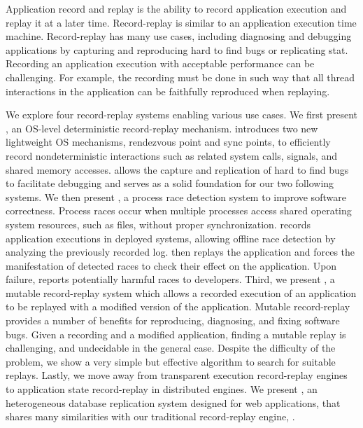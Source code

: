 Application record and replay is the ability to record application execution and
replay it at a later time.
Record-replay is similar to an application execution time machine.
Record-replay has many use cases, including diagnosing
and debugging applications by capturing and reproducing hard to find
bugs or replicating stat. Recording an application execution with acceptable performance can be
challenging. For example, the recording must be done in such way that all thread
interactions in the application can be faithfully reproduced when replaying.

We explore four record-replay systems enabling various use cases.
We first present \scribe, an OS-level deterministic record-replay mechanism.
\scribe introduces two new lightweight OS mechanisms, rendezvous point and sync
points, to efficiently record nondeterministic interactions such as related
system calls, signals, and shared memory accesses. \scribe allows the capture
and replication of hard to find bugs to facilitate debugging and serves as a
solid foundation for our two following systems.
We then present \racepro, a process race detection system to improve
software correctness. Process races occur when multiple processes access shared
operating system resources, such as files, without proper synchronization.
\racepro records application executions in deployed systems, allowing offline
race detection by analyzing the previously recorded log. \racepro then replays
the application and forces the manifestation of detected races to check their
effect on the application. Upon failure, \racepro reports potentially harmful
races to developers.
Third, we present \dora, a mutable record-replay system which allows a recorded
execution of an application to be replayed with a modified version of the
application. Mutable record-replay provides a number of benefits for
reproducing, diagnosing, and fixing software bugs. Given a recording and a
modified application, finding a mutable replay is challenging, and undecidable
in the general case. Despite the difficulty of the problem, we show a very
simple but effective algorithm to search for suitable replays.
Lastly, we move away from transparent execution record-replay engines to
application state record-replay in distributed engines. We present \synapse,
an heterogeneous database replication system designed for web applications,
that shares many similarities with our traditional record-replay engine, \scribe.
